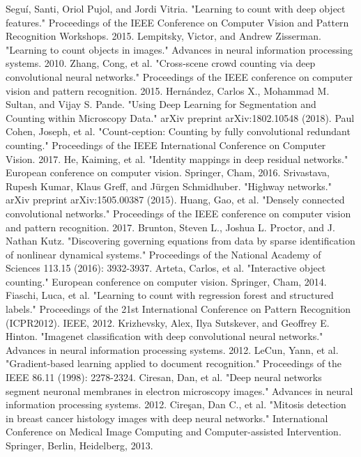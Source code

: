 \documentclass[conference]{IEEEtran}
\begin{document}
\begin{thebibliography}{00}
Seguí, Santi, Oriol Pujol, and Jordi Vitria. "Learning to count with deep object features." Proceedings of the IEEE Conference on Computer Vision and Pattern Recognition Workshops. 2015.
 Lempitsky, Victor, and Andrew Zisserman. "Learning to count objects in images." Advances in neural information processing systems. 2010.
 Zhang, Cong, et al. "Cross-scene crowd counting via deep convolutional neural networks." Proceedings of the IEEE conference on computer vision and pattern recognition. 2015.
 Hernández, Carlos X., Mohammad M. Sultan, and Vijay S. Pande. "Using Deep Learning for Segmentation and Counting within Microscopy Data." arXiv preprint arXiv:1802.10548 (2018).
 Paul Cohen, Joseph, et al. "Count-ception: Counting by fully convolutional redundant counting." Proceedings of the IEEE International Conference on Computer Vision. 2017.
 He, Kaiming, et al. "Identity mappings in deep residual networks." European conference on computer vision. Springer, Cham, 2016.
 Srivastava, Rupesh Kumar, Klaus Greff, and Jürgen Schmidhuber. "Highway networks." arXiv preprint arXiv:1505.00387 (2015).
 Huang, Gao, et al. "Densely connected convolutional networks." Proceedings of the IEEE conference on computer vision and pattern recognition. 2017.
 Brunton, Steven L., Joshua L. Proctor, and J. Nathan Kutz. "Discovering governing equations from data by sparse identification of nonlinear dynamical systems." Proceedings of the National Academy of Sciences 113.15 (2016): 3932-3937.
 Arteta, Carlos, et al. "Interactive object counting." European conference on computer vision. Springer, Cham, 2014.
 Fiaschi, Luca, et al. "Learning to count with regression forest and structured labels." Proceedings of the 21st International Conference on Pattern Recognition (ICPR2012). IEEE, 2012.
Krizhevsky, Alex, Ilya Sutskever, and Geoffrey E. Hinton. "Imagenet classification with deep convolutional neural networks." Advances in neural information processing systems. 2012.
 LeCun, Yann, et al. "Gradient-based learning applied to document recognition." Proceedings of the IEEE 86.11 (1998): 2278-2324.
 Ciresan, Dan, et al. "Deep neural networks segment neuronal membranes in electron microscopy images." Advances in neural information processing systems. 2012.
 Cireşan, Dan C., et al. "Mitosis detection in breast cancer histology images with deep neural networks." International Conference on Medical Image Computing and Computer-assisted Intervention. Springer, Berlin, Heidelberg, 2013.

\end{thebibliography}
\end{document}
